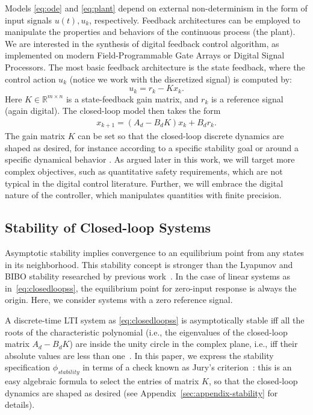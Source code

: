 \documentclass[runningheads,a4paper]{llncs}
\begin{document}
Models \eqref{eq:ode} and \eqref{eq:plant} depend on external non-determinism in the form of input signals $u (t), u_k$, respectively. 
Feedback architectures can be employed to manipulate the properties and behaviors of the continuous process (the plant).   
We are interested in the synthesis of digital feedback control algorithm, 
as implemented on modern Field-Programmable Gate Arrays or Digital Signal Processors. 
The most basic feedback architecture is the state feedback, 
where the control action $u_k$ (notice we work with the discretized signal) is computed by: 
%
\begin{equation}
\label{eq:controlaction}
u_k = r_{k} - K x_k. 
\end{equation}
%
Here $K \in \mathbb{R}^{m \times n}$ is a state-feedback gain matrix, 
and $r_{k}$ is a reference signal (again digital).   
%
The closed-loop model then takes the form 
\begin{align}
\label{eq:closedloopss}
x_{k+1} = ( A_d - B_d K ) x_k + B_d r_k.
\end{align}
%
The gain matrix $K$ can be set so that the closed-loop discrete dynamics are
shaped as desired, for instance according to a specific stability goal or
around a specific dynamical behavior \cite{astrom1997computer}.  As argued
later in this work, we will target more complex objectives, such as
quantitative safety requirements, which are not typical in the digital
control literature.  Further, we will embrace the digital nature of the
controller, which manipulates quantities with finite precision.

\subsection{Stability of Closed-loop Systems}
\label{ssec:stability}

Asymptotic stability implies convergence to an equilibrium point from any
states in its neighborhood.  This stability concept is stronger than the
Lyapunov and BIBO stability researched by previous
work~\cite{DBLP:conf/emsoft/RavanbakhshS16, hscc-paper,
DBLP:conf/hybrid/RouxJG15, DBLP:conf/hybrid/WangGRJF16}.  In the case of
linear systems as in~\eqref{eq:closedloopss}, the equilibrium point for
zero-input response is always the origin.  Here, we consider systems with a
zero reference signal.

A discrete-time LTI system as \eqref{eq:closedloopss} is asymptotically
stable iff all the roots of the characteristic polynomial (i.e., the
eigenvalues of the closed-loop matrix $A_d - B_d K$) are inside the unity
circle in the complex plane, i.e., iff their absolute values are less than
one~\cite{astrom1997computer}.  In this paper, we express the stability
specification $\phi_\mathit{stability}$ in terms of a check known as Jury's
criterion~\cite{fadali}: this is an easy algebraic formula to select the
entries of matrix $K$, so that the closed-loop dynamics are shaped as
desired (see Appendix~\ref{sec:appendix-stability} for details).
\end{document}
